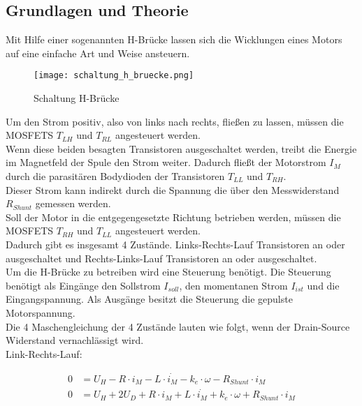 \subsection{Grundlagen und Theorie}

Mit Hilfe einer sogenannten H-Brücke lassen sich die Wicklungen eines
Motors auf eine einfache Art und Weise ansteuern.\\

\begin{figure}[H]
    \centering
    \texttt{[image: schaltung\_h\_bruecke.png]}
    \caption{Schaltung H-Brücke}
    \label{fig:Schaltung H-Bridge}
\end{figure}

Um den Strom positiv, also von links nach rechts, fließen zu lassen,
müssen die MOSFETS $T_{LH}$ und $T_{RL}$ angesteuert werden.\\

Wenn diese beiden besagten Transistoren ausgeschaltet werden, treibt die Energie im
Magnetfeld der Spule den Strom weiter. Dadurch fließt der Motorstrom $I_M$
durch die parasitären Bodydioden der Transistoren $T_{LL}$ und $T_{RH}$.\\

Dieser Strom kann indirekt durch die Spannung die über den Messwiderstand
$R_{Shunt}$ gemessen werden.\\

Soll der Motor in die entgegengesetzte Richtung betrieben werden, müssen
die MOSFETS $T_{RH}$ und $T_{LL}$ angesteuert werden.\\

Dadurch gibt es insgesamt 4 Zustände. Links-Rechts-Lauf Transistoren an oder
ausgeschaltet und Rechts-Links-Lauf Transistoren an oder ausgeschaltet.\\

Um die H-Brücke zu betreiben wird eine Steuerung benötigt. Die Steuerung
benötigt als Eingänge den Sollstrom $I_{soll}$, den momentanen Strom
$I_{ist}$ und die Eingangspannung. Als Ausgänge besitzt die Steuerung die
gepulste Motorspannung.\\

Die 4 Maschengleichung der 4 Zustände lauten wie folgt, wenn der
Drain-Source Widerstand vernachlässigt wird.\\

Link-Rechts-Lauf:

\begin{equation} \label{eq411}
    \begin{split}
        0 &= U_H - R \cdot i_M - L \cdot \dot{i_M} - k_e \cdot \omega - R_{Shunt} \cdot i_M\\
        0 &= U_H + 2 U_D + R \cdot i_M + L \cdot \dot{i_M} + k_e \cdot \omega + R_{Shunt} \cdot i_M
    \end{split}
\end{equation}

